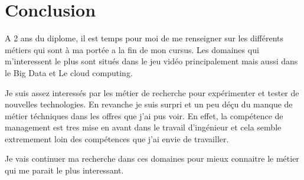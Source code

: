 \documentclass{article}
\begin{document}
    \section{Conclusion}

    A 2 ans du diplome, il est temps pour moi de me renseigner sur les différents métiers qui sont à ma portée a la fin de mon cursus.
    Les domaines qui m'interessent le plus sont situés dans le jeu vidéo principalement mais aussi dans le Big Data et Le cloud computing.

    Je suis assez interessés par les métier de recherche pour expérimenter et tester de nouvelles technologies.
    En revanche je suis surpri et un peu déçu du manque de métier téchniques dans les offres que j'ai pus voir.
    En effet, la compétence de management est tres mise en avant dans le travail d'ingénieur et cela semble extremement loin des compétences que j'ai envie de travailler.

    Je vais continuer ma recherche dans ces domaines pour mieux connaitre le métier qui me parait le plus interessant.
\end{document}
